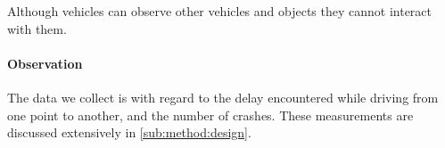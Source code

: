 Although vehicles can observe other vehicles and objects they cannot interact with them. 
 




\paragraph{Observation} 
The data we collect is with regard to the delay encountered while driving from one point to another, and the number of crashes. These measurements are discussed extensively in \cref{sub:method:design}.


